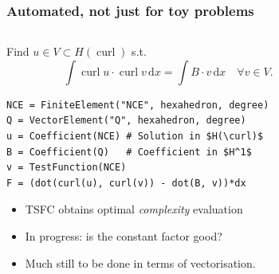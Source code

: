 \documentclass[presentation]{beamer}
\DeclareMathOperator{\curl}{curl}
\begin{document}
\begin{frame}[fragile]
  \frametitle{Automated, not just for toy problems}
  \begin{columns}
    \begin{column}{0.5\textwidth}
      \begin{block}{}
        Find $u \in V \subset H(\curl)$ s.t.
        {\scriptsize \begin{equation*}
          \int\!\!\curl u \cdot \curl v \,\text{d}x = \int\!\!B\cdot
          v\,\text{d}x \quad \forall v \in V.
        \end{equation*}}
\begin{verbatim}
NCE = FiniteElement("NCE", hexahedron, degree)
Q = VectorElement("Q", hexahedron, degree)
u = Coefficient(NCE) # Solution in $H(\curl)$
B = Coefficient(Q)   # Coefficient in $H^1$
v = TestFunction(NCE)
F = (dot(curl(u), curl(v)) - dot(B, v))*dx
\end{verbatim}
    \end{block}
    {\fontsize{9}{9}\selectfont
      \begin{itemize}
        \item<2-> TSFC obtains optimal \emph{complexity} evaluation
        \item<2-> In progress: is the constant factor good?
        \item<2-> Much still to be done in terms of vectorisation.
        \end{itemize}
      }
    \end{column}
  \begin{column}{0.6\textwidth}
  \begin{center}
\end{center}
\end{column}
\end{columns}
\end{frame}
\end{document}
